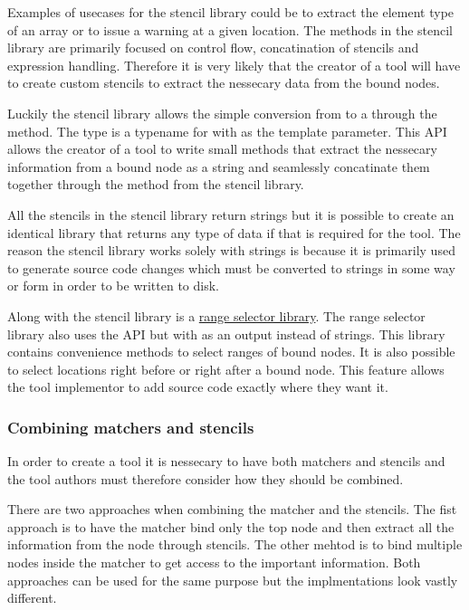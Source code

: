 Examples of usecases for the stencil library could be to extract the element type of an array or to issue a warning at a given location. The methods in the stencil library are primarily focused on control flow, concatination of stencils and expression handling. Therefore it is very likely that the creator of a tool will have to create custom stencils to extract the nessecary data from the bound nodes.

Luckily the stencil library allows the simple conversion from  to a  through the  method. The  type is a typename for  with  as the template parameter. This API allows the creator of a tool to write small methods that extract the nessecary information from a bound node as a string and seamlessly concatinate them together through the  method from the stencil library.

All the stencils in the stencil library return strings but it is possible to create an identical library that returns any type of data if that is required for the tool. The reason the stencil library works solely with strings is because it is primarily used to generate source code changes which must be converted to strings in some way or form in order to be written to disk. 

Along with the stencil library is a \href{https://github.com/llvm/llvm-project/blob/main/clang/include/clang/Tooling/Transformer/RangeSelector.h}{range selector library}. The range selector library also uses the  API but with  as an output instead of strings. This library contains convenience methods to select ranges of bound nodes. It is also possible to select locations right before or right after a bound node. This feature allows the tool implementor to add source code exactly where they want it.

\subsubsection*{Combining matchers and stencils}

In order to create a tool it is nessecary to have both matchers and stencils and the tool authors must therefore consider how they should be combined.

There are two approaches when combining the matcher and the stencils. The fist approach is to have the matcher bind only the top node and then extract all the information from the node through stencils. The other mehtod is to bind multiple nodes inside the matcher to get access to the important information. Both approaches can be used for the same purpose but the implmentations look vastly different.
 
